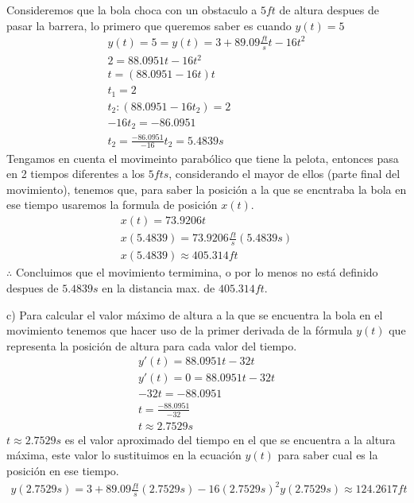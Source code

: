 \documentclass{article}
\begin{document}
    \vspace{5mm} %
    
    Consideremos que la bola choca con un obstaculo a $5ft$ de altura despues de pasar la barrera, lo primero que queremos saber es cuando $y(t)=5$
    \begin{gather*}
        y(t)=5=y(t)=3+89.09\frac{ft}{s}t-16t^2\\
        2=88.0951t-16t^2\\
        t=(88.0951-16t)t\\
        t_1=2\\
        t_2:(88.0951-16t_2)=2\\
        -16t_2=-86.0951\\
        t_2=\frac{-86.0951}{-16}
        t_2=5.4839s
    \end{gather*}
    Tengamos en cuenta el movimeinto parabólico que tiene la pelota, entonces pasa en 2 tiempos diferentes a los $5 fts$, considerando el mayor de ellos (parte final del movimiento), tenemos que, para saber la posición a la que se encntraba la bola en ese tiempo usaremos la formula de posición $x(t)$.
    \begin{gather*}
        x(t)=73.9206t\\
        x(5.4839)=73.9206\frac{ft}{s}(5.4839s)\\
        x(5.4839)\approx405.314ft
    \end{gather*}
    $\therefore$ Concluimos que el movimiento termimina, o por lo menos no está definido despues de $5.4839s$ en la distancia max. de $405.314ft$.
    
    \vspace{5mm} %
    
    c) Para calcular el valor máximo de altura a la que se encuentra la bola en el movimiento tenemos que hacer uso de la primer derivada de la fórmula $y(t)$ que representa la posición de altura para cada valor del tiempo.
    \begin{gather*}
        y'(t)=88.0951t-32t\\
        y'(t)=0=88.0951t-32t\\
        -32t=-88.0951\\
        t=\frac{-88.0951}{-32}\\
        t\approx 2.7529s
    \end{gather*}
    $t\approx 2.7529s$ es el valor aproximado del tiempo en el que se encuentra a la altura máxima, este valor lo sustituimos en la ecuación $y(t)$ para saber cual es la posición en ese tiempo.
    \begin{gather*}
        y(2.7529s)=3+89.09\frac{ft}{s}(2.7529s)-16(2.7529s)^2
        y(2.7529s)\approx 124.2617ft
    \end{gather*}
\end{document}
